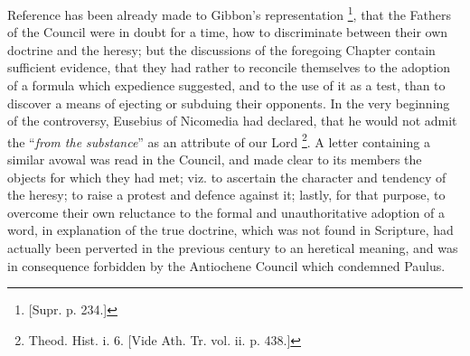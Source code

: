 Reference has been already made to Gibbon's representation \footnote{[Supr. p. 234.]}, that the Fathers of the Council were in doubt for a time, how
to discriminate between their own doctrine and the heresy; but the
discussions of the foregoing Chapter contain sufficient evidence, that
they had rather to reconcile themselves to the adoption of a formula
which expedience suggested, and to the use of it as a test, than to
discover a means of ejecting or subduing their opponents. In the very
beginning of the controversy, Eusebius of Nicomedia had declared, that
he would not admit the ``\emph{from the substance}'' as an
attribute of our Lord \footnote{Theod. Hist. i. 6. [Vide Ath. Tr. vol. ii.
p. 438.]}.
A letter containing a similar avowal was read in the Council, and made
clear to its members the objects for which they had met; viz. to
ascertain the character and tendency of the heresy; to raise a protest
and defence against it; lastly, for that purpose, to overcome
their own reluctance to the formal and unauthoritative adoption of a
word, in explanation of the true doctrine, which was not found in
Scripture, had actually been perverted in the previous century to an
heretical meaning, and was in consequence forbidden by the Antiochene
Council which condemned Paulus.

